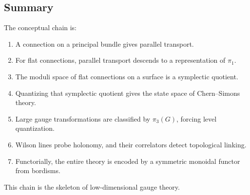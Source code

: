 \subsection{Summary}

The conceptual chain is:
\begin{enumerate}
\item A connection on a principal bundle gives parallel transport.
\item For flat connections, parallel transport descends to a representation of $\pi_1$.
\item The moduli space of flat connections on a surface is a symplectic quotient.
\item Quantizing that symplectic quotient gives the state space of Chern--Simons theory.
\item Large gauge transformations are classified by $\pi_3(G)$, forcing level quantization.
\item Wilson lines probe holonomy, and their correlators detect topological linking.
\item Functorially, the entire theory is encoded by a symmetric monoidal functor from bordisms.
\end{enumerate}
This chain is the skeleton of low-dimensional gauge theory.
